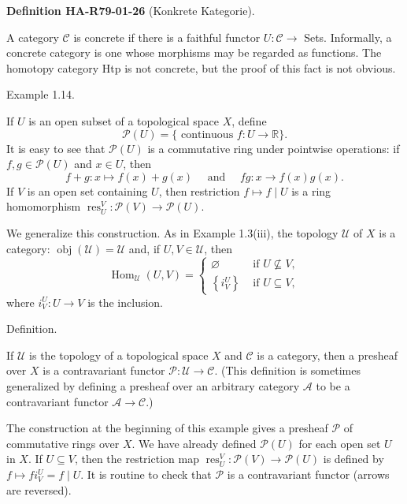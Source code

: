 \documentclass[10pt, letterpaper]{article}
\newcommand{\CustomHeading}[3]{%
  \par\medskip\noindent%
  \textbf{#1 #2} \textnormal{(#3)}.\enskip%
}
\newenvironment{DEF}[2]{\begin{unitbox}\CustomHeading{Definition}{#1}{#2}}{\end{unitbox}}
\begin{document}
\begin{DEF}{HA-R79-01-26}{Konkrete Kategorie}
A category $\mathcal{C}$ is concrete if there is a faithful functor $U: \mathcal{C} \rightarrow$ Sets. Informally, a concrete category is one whose morphisms may be regarded as functions. The homotopy category Htp is not concrete, but the proof of this fact is not obvious.
\end{DEF}

Example 1.14. 


If $U$ is an open subset of a topological space $X$, define
$$
\mathcal{P}(U)=\{\text { continuous } f: U \rightarrow \mathbb{R}\} .
$$
It is easy to see that $\mathcal{P}(U)$ is a commutative ring under pointwise operations: if $f, g \in \mathcal{P}(U)$ and $x \in U$, then
$$
f+g: x \mapsto f(x)+g(x) \quad \text { and } \quad f g: x \rightarrow f(x) g(x) .
$$
If $V$ is an open set containing $U$, then restriction $f \mapsto f \mid U$ is a ring homomorphism $\operatorname{res}_{U}^{V}: \mathcal{P}(V) \rightarrow \mathcal{P}(U)$.

We generalize this construction. As in Example 1.3(iii), the topology $\mathcal{U}$ of $X$ is a category: $\operatorname{obj}(\mathcal{U})=\mathcal{U}$ and, if $U, V \in \mathcal{U}$, then
$$
\operatorname{Hom}_{\mathcal{U}}(U, V)= \begin{cases}\varnothing & \text { if } U \nsubseteq V, \\ \left\{i_{V}^{U}\right\} & \text { if } U \subseteq V,\end{cases}
$$
where $i_{V}^{U}: U \rightarrow V$ is the inclusion.


Definition. 

If $\mathcal{U}$ is the topology of a topological space $X$ and $\mathcal{C}$ is a category, then a presheaf over $X$ is a contravariant functor $\mathcal{P}: \mathcal{U} \rightarrow \mathcal{C}$. (This definition is sometimes generalized by defining a presheaf over an arbitrary category $\mathcal{A}$ to be a contravariant functor $\mathcal{A} \rightarrow \mathcal{C}$.)

The construction at the beginning of this example gives a presheaf $\mathcal{P}$ of commutative rings over $X$. We have already defined $\mathcal{P}(U)$ for each open set $U$ in $X$. If $U \subseteq V$, then the restriction map $\operatorname{res}_{U}^{V}: \mathcal{P}(V) \rightarrow \mathcal{P}(U)$ is defined by $f \mapsto f i_{V}^{U}=f \mid U$. It is routine to check that $\mathcal{P}$ is a contravariant functor (arrows are reversed).
\end{document}
